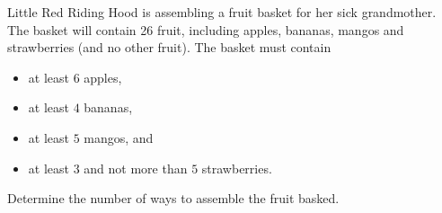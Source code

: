 
\begin{problem}
Little Red Riding Hood is assembling a fruit basket for her sick grandmother.
The basket will contain 26 fruit, including
apples, bananas, mangos and strawberries (and no other fruit). 
The basket must contain
%
\begin{itemize}
	\item at least $6$ apples, 
	\item at least $4$ bananas, 
	\item at least $5$ mangos, and
	\item at least $3$ and not more than $5$ strawberries. 
\end{itemize}
%
Determine the number of ways to assemble the fruit basked.
\end{problem}

